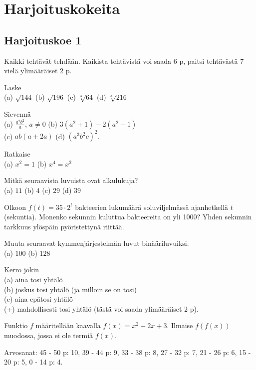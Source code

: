 \chapter{Harjoituskokeita}

\section*{Harjoituskoe 1}

\begin{description}
	\item Kaikki tehtävät tehdään. Kaikista tehtävistä voi saada 6 p, paitsi tehtävästä 7 vielä ylimääräiset 2 p.
	\item[1.] Laske \\
	(a) $\sqrt{144}$ \qquad
	(b) $\sqrt{196}$ \qquad
	(c) $\sqrt[3]{64}$ \qquad
	(d) $\sqrt[3]{216}$
	\item[2.] Sievennä \\
	(a) $\frac{a^2 b^2}{a}$, $a \neq 0$ \qquad
	(b) $3(a^2+1)-2(a^2-1)$ \\
	(c) $ab(a+2a)$ \qquad
	(d) $(a^3 b^2 c)^2$.
	\item[3.] Ratkaise \\
	(a) $x^2 = 1$
	(b) $x^4 = x^2$
	\item[4.] Mitkä seuraavista luvuista ovat alkulukuja? \\
	(a) $11$ \qquad
	(b) $4$ \qquad
	(c) $29$ \qquad
	(d) $39$
	\item[5.] Olkoon $f(t) = 35 \cdot 2^t$ bakteerien lukumäärä soluviljelmässä ajanhetkellä $t$ (sekuntia). Monenko sekunnin kuluttua bakteereita on yli 1000? Yhden sekunnin tarkkuus ylöspäin pyöristettynä riittää.
	\item[6.] Muuta seuraavat kymmenjärjestelmän luvut binääriluvuiksi. \\
	(a) $100$ \qquad
	(b) $128$
	\item[7.] Kerro jokin \\
	(a) aina tosi yhtälö \\
	(b) joskus tosi yhtälö (ja milloin se on tosi) \\
	(c) aina epätosi yhtälö \\
	(+) mahdollisesti tosi yhtälö (tästä voi saada ylimääräiset 2 p).
	\item[8.] Funktio $f$ määritellään kaavalla $f(x) = x^2 + 2x + 3$. Ilmaise $f(f(x))$ muodossa, jossa ei ole termiä $f(x)$.
	\item Arvosanat: 45 - 50 p: 10, 39 - 44 p: 9, 33 - 38 p: 8, 27 - 32 p: 7, 21 - 26 p: 6, 15 - 20 p: 5, 0 - 14 p: 4.
\end{description}
